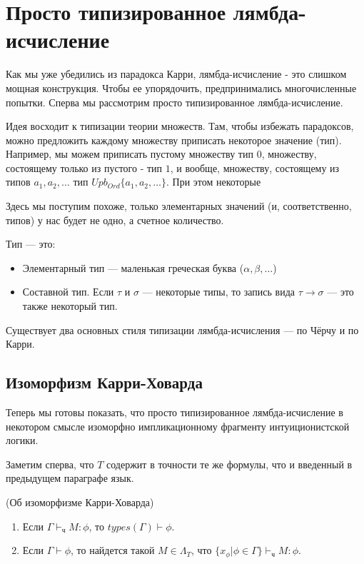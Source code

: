 \section{Просто типизированное лямбда-исчисление}

Как мы уже убедились из парадокса Карри, лямбда-исчисление - это слишком мощная 
конструкция. Чтобы ее упорядочить, предпринимались многочисленные попытки.
Сперва мы рассмотрим просто типизированное лямбда-исчисление.

Идея восходит к типизации теории множеств. Там, чтобы избежать парадоксов,
можно предложить каждому множеству приписать некоторое значение (тип). Например,
мы можем приписать пустому множеству тип $0$, множеству, состоящему только из 
пустого - тип $1$, и вообще, множеству, состоящему из типов $a_1, a_2, \dots$
тип $Upb_{Ord} \{a_1, a_2, \dots\}$. При этом некоторые 

Здесь мы поступим похоже, только элементарных значений (и, соответственно, 
типов) у нас будет не одно, а счетное количество.

\begin{definition}
Тип --- это:
\begin{itemize}
\item Элементарный тип --- маленькая греческая буква ($\alpha, \beta, \dots$)
\item Составной тип. Если $\tau$ и $\sigma$ --- некоторые типы, то запись 
вида $\tau \rightarrow \sigma$ --- это также некоторый тип.
\end{itemize}
\end{definition}

Существует два основных стиля типизации лямбда-исчисления --- по Чёрчу и 
по Карри.


\subsection{Изоморфизм Карри-Ховарда}

Теперь мы готовы показать, что просто типизированное лямбда-исчисление в некотором
смысле изоморфно импликационному фрагменту интуиционистской логики.

Заметим сперва, что $T$ содержит в точности те же формулы, что и введенный в предыдущем
параграфе язык.
                 
\begin{theorem}(Об изоморфизме Карри-Ховарда)
\begin{enumerate}
\item Если $\Gamma \vdash_\texttt{ч} M:\phi$, то $types(\Gamma) \vdash \phi$.
\item Если $\Gamma \vdash \phi$, то найдется такой $M \in \Lambda_T$, что
$\{x_\phi | \phi\in\Gamma\}\vdash_\texttt{ч} M:\phi$.
\end{enumerate}
\end{theorem}

